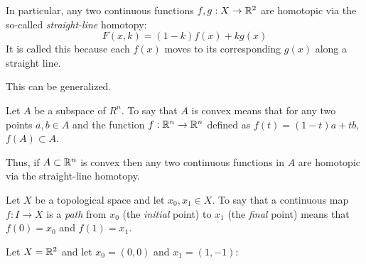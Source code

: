 \documentclass[letterpaper,12pt,fleqn]{article}
\begin{document}
In particular, any two continuous functions \(f,g:X\to\mathbb{R}^2\) are homotopic via the so-called \emph{straight-line}
homotopy:
\[F(x,k)=(1-k)f(x)+kg(x)\]
It is called this because each \(f(x)\) moves to its corresponding \(g(x)\) along a straight line.

This can be generalized.

\begin{definition}[Convex]
  Let \(A\) be a subspace of \(R^n\).  To say that \(A\) is convex means that for any two points \(a,b\in A\) and
  the function \(f:\mathbb{R}^n\to\mathbb{R}^n\) defined as \(f(t)=(1-t)a+tb\), \(f(A)\subset A\).
\end{definition}

Thus, if \(A\subset\mathbb{R}^n\) is convex then any two continuous functions in \(A\) are homotopic via the straight-line
homotopy.

\begin{definition}[Path]
  Let \(X\) be a topological space and let \(x_0,x_1\in X\).  To say that a continuous map \(f:I\to X\) is a
  \emph{path} from \(x_0\) (the \emph{initial} point) to \(x_1\) (the \emph{final} point) means that \(f(0)=x_0\)
  and \(f(1)=x_1\).
\end{definition}

\begin{example}[Paths]
  Let \(X=\mathbb{R}^2\) and let \(x_0=(0,0)\) and \(x_1=(1,-1)\):

\end{example}
\end{document}
